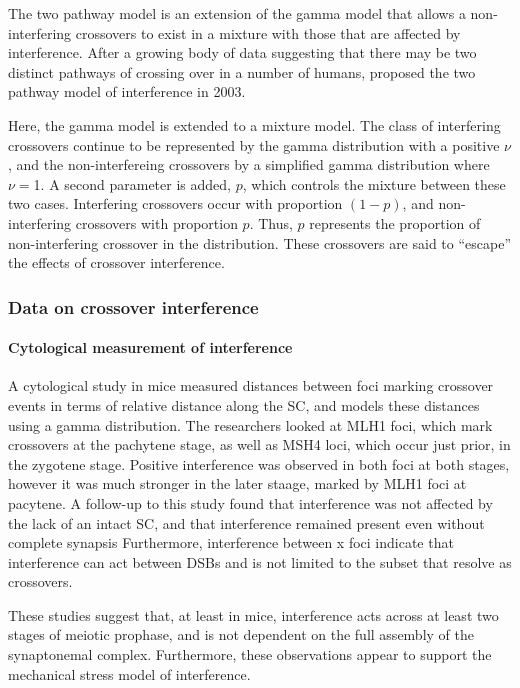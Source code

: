The two pathway model is an extension of the gamma model that allows a non-interfering crossovers to exist in a mixture with those that are affected by interference.
After a growing body of data suggesting that there may be two distinct pathways of crossing over in a number of humans, \citet{Housworth2003} proposed the two pathway model of interference in 2003.

Here, the gamma model is extended to a mixture model.
The class of interfering crossovers continue to be represented by the gamma distribution with a positive $\nu$, and the non-interfereing crossovers by a simplified gamma distribution where $\nu=$1.
A second parameter is added, $p$, which controls the mixture between these two cases.
Interfering crossovers occur with proportion $(1-p)$, and non-interfering crossovers with proportion $p$.
Thus, $p$ represents the proportion of non-interfering crossover in the distribution.
These crossovers are said to ``escape'' the effects of crossover interference.

\subsubsection{Data on crossover interference}

\paragraph{Cytological measurement of interference}
A cytological study in mice measured distances between foci marking crossover events in terms of relative distance along the SC, and models these distances using a gamma distribution\cite{DeBoer2006a}.
The researchers looked at MLH1 foci, which mark crossovers at the pachytene stage, as well as MSH4 loci, which occur just prior, in the zygotene stage.
Positive interference was observed in both foci at both stages, however it was much stronger in the later staage, marked by MLH1 foci at pacytene.
A follow-up to this study found that interference was not affected by the lack of an intact SC, and that interference remained present even without complete synapsis\cite{DeBoer2007}
Furthermore, interference between x foci indicate that interference can act between DSBs and is not limited to the subset that resolve as crossovers\cite{Baudat2007}.

These studies suggest that, at least in mice, interference acts across at least two stages of meiotic prophase, and is not dependent on the full assembly of the synaptonemal complex.
Furthermore, these observations appear to support the mechanical stress model of interference.

